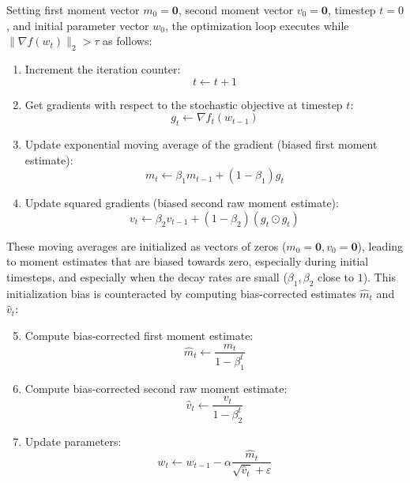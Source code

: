 \documentclass[11pt,a4paper]{article}
\begin{document}
\noindent Setting first moment vector $m_0 = \mathbf{0}$, second moment vector $v_0 = \mathbf{0}$, timestep $t = 0$, and initial parameter vector $w_0$, the optimization loop executes while $\|\nabla f(w_t)\|_2 > \tau$ as follows:

\begin{enumerate}
    \item Increment the iteration counter:
    \begin{equation}
        t \leftarrow t + 1
    \end{equation}
    \item Get gradients with respect to the stochastic objective at timestep $t$:
    \begin{equation}
        g_t \leftarrow \nabla f_t(w_{t-1}) \label{eq:grad}
    \end{equation}
    \item Update exponential moving average of the gradient (biased first moment estimate):
    \begin{equation}
        m_t \leftarrow \beta_1 m_{t-1} + (1 - \beta_1) g_t \label{eq:m_update}
    \end{equation}
    \item Update squared gradients (biased second raw moment estimate):
    \begin{equation}
        v_t \leftarrow \beta_2 v_{t-1} + (1 - \beta_2) (g_t \odot g_t) \label{eq:v_update}
    \end{equation}
\end{enumerate}

\noindent These moving averages are initialized as vectors of zeros ($m_0 = \mathbf{0}, v_0 = \mathbf{0}$), leading to moment estimates that are biased towards zero, especially during initial timesteps, and especially when the decay rates are small ($\beta_1, \beta_2$ close to $1$). This initialization bias is counteracted by computing bias-corrected estimates $\hat{m}_t$ and $\hat{v}_t$:

\begin{enumerate}
    \setcounter{enumi}{4}
    \item Compute bias-corrected first moment estimate:
    \begin{equation}
        \hat{m}_t \leftarrow \frac{m_t}{1 - \beta_1^t} \label{eq:m_hat}
    \end{equation}
    \item Compute bias-corrected second raw moment estimate:
    \begin{equation}
        \hat{v}_t \leftarrow \frac{v_t}{1 - \beta_2^t} \label{eq:v_hat}
    \end{equation}
    \item Update parameters:
    \begin{equation}
        w_t \leftarrow w_{t-1} - \alpha \frac{\hat{m}_t}{\sqrt{\hat{v}_t} + \varepsilon} \label{eq:w_update}
    \end{equation}
\end{enumerate}
\end{document}

